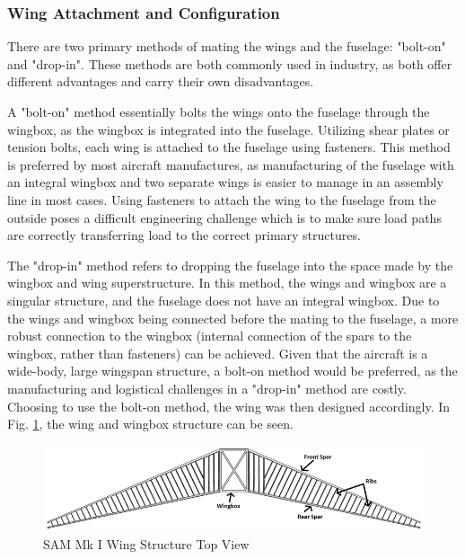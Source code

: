 \subsubsection{Wing Attachment and Configuration}
There are two primary methods of mating the wings and the fuselage: "bolt-on" and "drop-in". These methods are both commonly used in industry, as both offer different advantages and carry their own disadvantages. 

A "bolt-on" method essentially bolts the wings onto the fuselage through the wingbox, as the wingbox is integrated into the fuselage. Utilizing shear plates or tension bolts, each wing is attached to the fuselage using fasteners. This method is preferred by most aircraft manufactures, as manufacturing of the fuselage with an integral wingbox and two separate wings is easier to manage in an assembly line in most cases. Using fasteners to attach the wing to the fuselage from the outside poses a difficult engineering challenge which is to make sure load paths are correctly transferring load to the correct primary structures.

The "drop-in" method refers to dropping the fuselage into the space made by the wingbox and wing superstructure. In this method, the wings and wingbox are a singular structure, and the fuselage does not have an integral wingbox. Due to the wings and wingbox being connected before the mating to the fuselage, a more robust connection to the wingbox (internal connection of the spars to the wingbox, rather than fasteners) can be achieved. 
Given that the aircraft is a wide-body, large wingspan structure, a bolt-on method would be preferred, as the manufacturing and logistical challenges in a "drop-in" method are costly. Choosing to use the bolt-on method, the wing was then designed accordingly. In Fig. \ref{fig:wing_structure}, the wing and wingbox structure can be seen.

\begin{figure}[!h]
    \centering
    \includegraphics[width=\linewidth]{Photos/structuresandloads/Wing Structure.PNG}
    \caption{SAM Mk I Wing Structure Top View}
    \label{fig:wing_structure}
\end{figure}
\FloatBarrier

